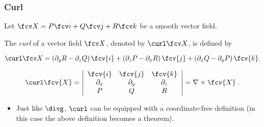 \begin{frame}
\frametitle{Curl}
Let $\fcv X=P\fcv i+Q\fcv j +R\fcv k$ be a smooth vector field.

\begin{definition}
The \emph{curl} of a vector field $\fcv X$, denoted by $\curl \fcv X$, is defined by

\hfil $\curl \fcv X = \left(\partial_y R - \partial_z Q\right) \fcv{i} +  (\partial_z P - \partial_x R) \, \fcv{j} + (\partial_x Q - \partial_y P) \, \fcv{k} .$
\end{definition}

$$\curl \fcv{X} = 
\left| \begin{array}{ccc}
\fcv{i} & \fcv{j} & \fcv{k} \\
\partial_x & \partial_y & \partial_z \\
P & Q & R
\end{array}\right| = \nabla \times \fcv{X}\; .$$


\begin{itemize}
\item Just like $\divg$, $\curl$ can be equipped with a coordinate-free definition (in this case the above definition becomes a theorem).
\end{itemize}

\end{frame}